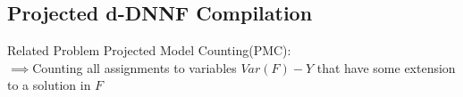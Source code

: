 \documentclass[
	aspectratio=169, %
	8pt, %
]{beamer}
\begin{document}
\subsection{Projected d-DNNF Compilation}
\begin{frame}{\insertsubsection}
	\centering
{}
\pause
\begin{block}{Related Problem}
	Projected Model Counting(PMC):\\
	$\implies$Counting all assignments to variables $Var(F)-Y$ that have some extension to a solution in $F$\\
\end{block}
\end{frame}
\end{document}
